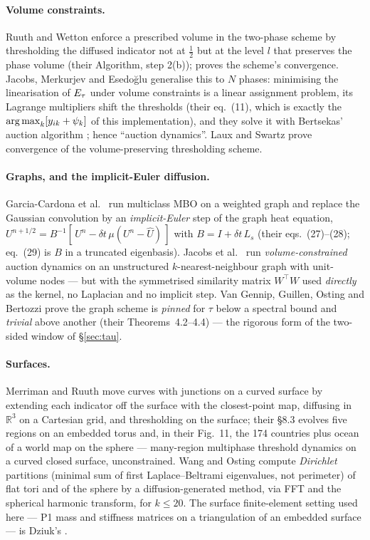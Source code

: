 \documentclass[11pt,a4paper]{article}
\begin{document}
\paragraph{Volume constraints.} Ruuth and Wetton \cite{ruuth2003volume} enforce a
prescribed volume in the two-phase scheme by thresholding the diffused
indicator not at $\tfrac12$ but at the level $l$ that preserves the phase volume
(their Algorithm, step 2(b)); \cite{laux2017bulk} proves the scheme's
convergence. Jacobs, Merkurjev and Esedo\u{g}lu
\cite{jacobs2018auction} generalise this to $N$ phases: minimising the
linearisation of $E_\tau$ under volume constraints is a linear assignment problem,
its Lagrange multipliers shift the thresholds (their eq.~(11), which is exactly
the $\operatorname*{arg\,max}_k[y_{ik} + \psi_k]$ of this implementation), and they solve it with
Bertsekas' auction algorithm \cite{bertsekas1988auction}; hence ``auction
dynamics''. Laux and Swartz \cite{laux2017bulk} prove convergence of the
volume-preserving thresholding scheme.

\paragraph{Graphs, and the implicit-Euler diffusion.} Garcia-Cardona et al.\
\cite{garcia2014multiclass} run multiclass MBO on a weighted graph and replace
the Gaussian convolution by an \emph{implicit-Euler} step of the graph heat
equation, $U^{n+1/2} = B^{-1}[\,U^n - \delta t\, \mu (U^n - \hat U)\,]$ with
$B = I + \delta t\, L_s$ (their eqs.~(27)--(28); eq.~(29) is $B$ in a truncated
eigenbasis). Jacobs et al.\ \cite[\S5]{jacobs2018auction} run
\emph{volume-constrained} auction dynamics on an unstructured $k$-nearest-neighbour
graph with unit-volume nodes --- but with the symmetrised similarity matrix
$W^\top W$ used \emph{directly} as the kernel, no Laplacian and no implicit
step. Van Gennip, Guillen, Osting and Bertozzi
\cite{vangennip2014mean} prove the graph scheme is \emph{pinned} for $\tau$ below a
spectral bound and \emph{trivial} above another (their Theorems~4.2--4.4) --- the
rigorous form of the two-sided window of \S\ref{sec:tau}.

\paragraph{Surfaces.} Merriman and Ruuth \cite{merriman2007surfaces} move curves
with junctions on a curved surface by extending each indicator off the surface
with the closest-point map, diffusing in $\mathbb{R}^3$ on a Cartesian grid, and
thresholding on the surface; their \S8.3 evolves five regions on an embedded
torus and, in their Fig.~11, the 174 countries plus ocean of a world map on the
sphere --- many-region multiphase threshold dynamics on a curved closed surface,
unconstrained. Wang and Osting \cite{wang2019dirichlet} compute \emph{Dirichlet}
partitions (minimal sum of first Laplace--Beltrami eigenvalues, not perimeter) of
flat tori and of the sphere by a diffusion-generated method, via FFT and the
spherical harmonic transform, for $k \le 20$. The surface finite-element setting
used here --- P1 mass and stiffness matrices on a triangulation of an embedded
surface --- is Dziuk's \cite{dziuk1988beltrami, dziuk2013surfacefem}.
\end{document}
